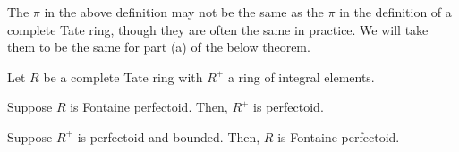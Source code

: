 \documentclass[11pt]{article}
\begin{document}
The $\pi$ in the above definition may not be the same as the $\pi$ in the definition of a complete Tate ring, though they are often the same in practice. We will take them to be the same for part \textrm{(a)} of the below theorem.

\begin{theorem}
Let $R$ be a complete Tate ring with $R^+$ a ring of integral elements. 
\begin{enum}{\alph}
\item Suppose $R$ is Fontaine perfectoid. Then, $R^+$ is perfectoid.

\item Suppose $R^+$ is perfectoid and bounded. Then, $R$ is Fontaine perfectoid.
\end{enum}
\end{theorem}
\end{document}
